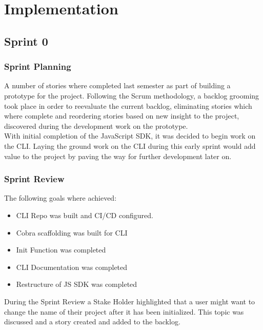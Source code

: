 \section{Implementation}

\subsection{Sprint 0}
\subsubsection{Sprint Planning}
A number of stories where completed last semester as part of building a prototype for the project. Following the Scrum methodology, a backlog grooming took place in order to reevaluate the current backlog, eliminating stories which where complete and reordering stories based on new insight to the project, discovered during the development work on the prototype.
\\With initial completion of the JavaScript SDK, it was decided to begin work on the CLI. Laying the ground work on the CLI during this early sprint would add value to the project by paving the way for further development later on.
\subsubsection{Sprint Review}
The following goals where achieved:
\begin{itemize}
    \item CLI Repo was built and CI/CD configured.
    \item Cobra scaffolding was built for CLI
    \item Init Function was completed
    \item CLI Documentation was completed
    \item Restructure of JS SDK was completed
\end{itemize}
During the Sprint Review a Stake Holder highlighted that a user might want to change the name of their project after it has been initialized. This topic was discussed and a story created and added to the backlog.

